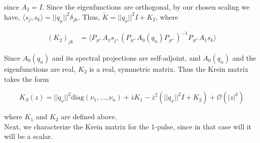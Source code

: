 \documentclass[12pt]{article}
\begin{document}
since $A_2 = I$. Since the eigenfunctions are orthogonal, by our chosen scaling we have, $\langle s_j, s_k \rangle = ||q_x||^2 \delta_{jk}$. Thus, $\tilde{K} = ||q_x||^2 I + K_2$, where

\begin{align*}
(K_2)_{jk} &= 
\langle P_{S^\perp} A_1 s_j, (P_{S^\perp} A_0(q_n) P_{S^\perp})^{-1} P_{S^\perp} A_1 s_k \rangle
\end{align*}

Since $A_0(q_n)$ and its spectral projections are self-adjoint, and $A_0(q_n)$ and the eigenfunctions are real, $K_2$ is a real, symmetric matrix. Thus the Krein matrix takes the form

\begin{equation}\label{Kreinform}
K_S(z) = ||q_x||^2 \text{diag}(\nu_1, \dots, \nu_n) + \overline{z} K_1 
- \overline{z}^2 ( ||q_x||^2 I + K_2) + \mathcal{O}(|z|^3)
\end{equation}

where $K_1$ and $K_2$ are defined above.\\

Next, we characterize the Krein matrix for the 1-pulse, since in that case will it will be a scalar.

\end{document}

